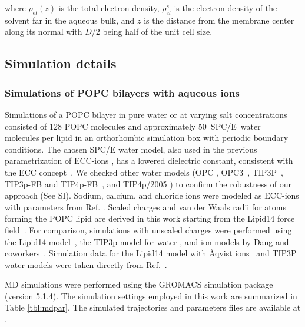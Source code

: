 \documentclass[aip,jcp,twocolumn]{revtex4}
\begin{document}
\noindent where $\rho_{el} (z)$ is the total electron density, $\rho_{el}^s$ is the electron density of the solvent far in the aqueous bulk, and $z$ is the distance from the membrane center along its normal with $D/2$ being half of the unit cell size.  




\subsection{Simulation details}

\subsubsection{Simulations of POPC bilayers with aqueous ions}
Simulations of a POPC bilayer in pure water or at varying salt concentrations consisted of 128 POPC molecules and approximately 50~SPC/E~water~\cite{Berendsen1987} molecules per lipid in an orthorhombic simulation box with periodic boundary conditions.  The chosen SPC/E water model, also used in the previous parametrization of ECC-ions \cite{jungwirth17-new-paper-to-be-published, kohagen16, Pluharova2014}, has a lowered dielectric constant, consistent with the ECC concept~\cite{leontyev11, leontyev14}.  We checked other water models (OPC \cite{Izadi14}, OPC3~\cite{Izadi16}, TIP3P~\cite{jorgensen83}, TIP3p-FB and TIP4p-FB~\cite{Wang2014}, and TIP4p/2005 \cite{Abascal2005}) to confirm the robustness of our approach (See SI). Sodium, calcium, and chloride ions were modeled as ECC-ions with parameters from Ref. .  
Scaled charges and van der Waals radii for atoms forming the POPC lipid are derived in this work starting from the Lipid14 force field~\cite{REF}. For comparison, simulations with unscaled charges were performed using the Lipid14 model~\cite{REF}, the TIP3p model for water \cite{jorgensen83}, and ion models by Dang and coworkers~\cite{smith94,chang1999,dang2006}. Simulation data for the Lipid14 model with \AA{}qvist ions~\cite{aqvist90} and TIP3P~\cite{jorgensen83} water models were taken directly from Ref.~.  

MD simulations were performed using the GROMACS \cite{Abraham15} simulation package (version 5.1.4). The simulation settings employed in this work are summarized in Table \ref{tbl:mdpar}. The simulated trajectories and parameters files are available at \cite{??} .
\end{document}
